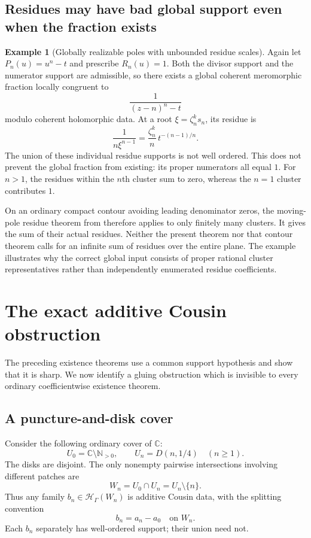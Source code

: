 \documentclass[11pt,letterpaper]{article}
\theoremstyle{definition}
\newtheorem{example}[theorem]{Example}
\theoremstyle{remark}
\newcommand{\C}{\mathbb C}
\newcommand{\N}{\mathbb N}
\newcommand{\HH}{\mathscr H_\Gamma}
\numberwithin{equation}{section}
\begin{document}
\subsection{Residues may have bad global support even when the fraction exists}
\begin{example}[Globally realizable poles with unbounded residue scales]\label{ex:MLresidues}
Again let $P_n(u)=u^n-t$ and prescribe $R_n(u)=1$. Both the divisor support and the numerator support are admissible, so there exists a global coherent meromorphic fraction locally congruent to
\[
 \frac1{(z-n)^n-t}
\]
modulo coherent holomorphic data. At a root $\xi=\zeta_n^ks_n$, its residue is
\begin{equation}\label{eq:individualresidues}
 \frac1{n\xi^{n-1}}
 =\frac{\zeta_n^k}{n}\,t^{-(n-1)/n}.
\end{equation}
The union of these individual residue supports is not well ordered. This does not prevent the global fraction from existing: its proper numerators all equal $1$. For $n>1$, the residues within the $n$th cluster sum to zero, whereas the $n=1$ cluster contributes $1$.
\end{example}
On an ordinary compact contour avoiding leading denominator zeros, the moving-pole residue theorem from \cite{Supplied} therefore applies to only finitely many clusters. It gives the sum of their actual residues. Neither the present theorem nor that contour theorem calls for an infinite sum of residues over the entire plane. The example illustrates why the correct global input consists of proper rational cluster representatives rather than independently enumerated residue coefficients.

\section{The exact additive Cousin obstruction}\label{sec:cousin}
The preceding existence theorems use a common support hypothesis and show that it is sharp. We now identify a gluing obstruction which is invisible to every ordinary coefficientwise existence theorem.

\subsection{A puncture-and-disk cover}
Consider the following ordinary cover of $\C$:
\begin{equation}\label{eq:starcover}
 U_0=\C\setminus\N_{>0},\qquad
 U_n=D(n,1/4)\quad(n\ge1).
\end{equation}
The disks are disjoint. The only nonempty pairwise intersections involving different patches are
\[
 W_n=U_0\cap U_n=U_n\setminus\{n\}.
\]
Thus any family $b_n\in\HH(W_n)$ is additive Cousin data, with the splitting convention
\begin{equation}\label{eq:cousinsplit}
 b_n=a_n-a_0\quad\text{on }W_n.
\end{equation}
Each $b_n$ separately has well-ordered support; their union need not.
\end{document}
